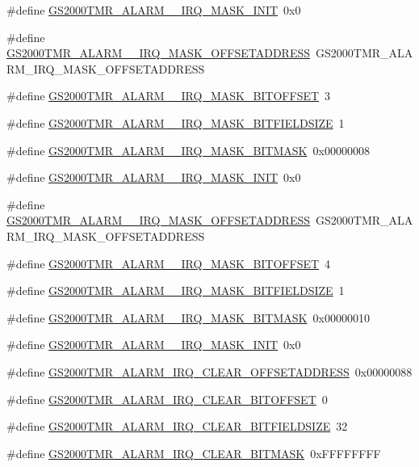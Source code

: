 \begin{DoxyCompactItemize}
\item 
\#define \hyperlink{a00556_a64e18586ef2654860bff26525e237296}{GS2000TMR\_\-ALARM\_\_\-IRQ\_\-MASK\_\-INIT}~0x0
\item 
\#define \hyperlink{a00556_af0c0f9cd8bb9e2f08bae5e54c7cb36a0}{GS2000TMR\_\-ALARM\_\_\-IRQ\_\-MASK\_\-OFFSETADDRESS}~GS2000TMR\_\-ALARM\_\-IRQ\_\-MASK\_\-OFFSETADDRESS
\item 
\#define \hyperlink{a00556_aba736ef4c5478bbb706a69525c7fe421}{GS2000TMR\_\-ALARM\_\_\-IRQ\_\-MASK\_\-BITOFFSET}~3
\item 
\#define \hyperlink{a00556_afda6855b6d3ef632c8d0285f035043fd}{GS2000TMR\_\-ALARM\_\_\-IRQ\_\-MASK\_\-BITFIELDSIZE}~1
\item 
\#define \hyperlink{a00556_aad7b0e159717444fa718237c3ccc5178}{GS2000TMR\_\-ALARM\_\_\-IRQ\_\-MASK\_\-BITMASK}~0x00000008
\item 
\#define \hyperlink{a00556_a229905d40cdc0257d53f2b989f8e48ad}{GS2000TMR\_\-ALARM\_\_\-IRQ\_\-MASK\_\-INIT}~0x0
\item 
\#define \hyperlink{a00556_a82b9fae08b0fa78ba4cebc307b4dfff3}{GS2000TMR\_\-ALARM\_\_\-IRQ\_\-MASK\_\-OFFSETADDRESS}~GS2000TMR\_\-ALARM\_\-IRQ\_\-MASK\_\-OFFSETADDRESS
\item 
\#define \hyperlink{a00556_a14191b897126df3cad5e1d9cc8f07fd7}{GS2000TMR\_\-ALARM\_\_\-IRQ\_\-MASK\_\-BITOFFSET}~4
\item 
\#define \hyperlink{a00556_a75790a9dc9a141a7982238ba0177cfb1}{GS2000TMR\_\-ALARM\_\_\-IRQ\_\-MASK\_\-BITFIELDSIZE}~1
\item 
\#define \hyperlink{a00556_a7ad3659573bdbdd5fae98d43f1b8a8f2}{GS2000TMR\_\-ALARM\_\_\-IRQ\_\-MASK\_\-BITMASK}~0x00000010
\item 
\#define \hyperlink{a00556_af6bfd64ac2fed7966598124a55cb4dfb}{GS2000TMR\_\-ALARM\_\_\-IRQ\_\-MASK\_\-INIT}~0x0
\item 
\#define \hyperlink{a00556_ac917a5d872a185f25010650f071d6460}{GS2000TMR\_\-ALARM\_\-IRQ\_\-CLEAR\_\-OFFSETADDRESS}~0x00000088
\item 
\#define \hyperlink{a00556_ab9ce8700591101b9aa32c787b4cfc4bd}{GS2000TMR\_\-ALARM\_\-IRQ\_\-CLEAR\_\-BITOFFSET}~0
\item 
\#define \hyperlink{a00556_adf73b591193fd0f25640e72f28d8b1b5}{GS2000TMR\_\-ALARM\_\-IRQ\_\-CLEAR\_\-BITFIELDSIZE}~32
\item 
\#define \hyperlink{a00556_a247533286497ababf64977d56a24aacd}{GS2000TMR\_\-ALARM\_\-IRQ\_\-CLEAR\_\-BITMASK}~0xFFFFFFFF
\item 

\end{DoxyCompactItemize}
